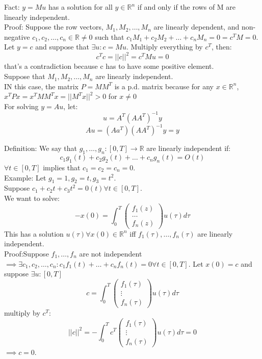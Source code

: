 \documentclass{article}
\begin{document}
Fact: $y=Mu$ has a solution for all $y\in\mathbb{R}^n$ if and only if the rows of M are linearly independent.\\
Proof: Suppose the row vectors, $M_1,M_2,\dots,M_n$ are linearly dependent, and non-negative $c_1,c_2,\dots,c_n\in\mathbb{R}\neq 0$ such that $c_1M_1+c_2M_2+\dots+c_nM_n=0=c^TM=0$.
Let $y=c$ and suppose that $\exists u: c=Mu$. Multiply everything by $c^T$, then:
\[c^Tc=\lvert\lvert c\rvert\rvert^2=c^TMu=0\]
that's a contradiction because c has to have some positive element.\\
Suppose that $M_1,M_2,\dots,M_n$ are linearly independent.\\
IN this case, the matrix $P=MM^T$ is a p.d. matrix because for any $x\in\mathbb{R}^n$, $x^TPx=x^TMM^Tx=\lvert\lvert M^Tx\rvert\rvert^2>0$ for $x\neq 0$\\
For solving $y=Au$, let:\\
\[u=A^T(AA^T)^{-1}y\]
\[Au=(Aa^T)(AA^T)^{-1}y=y\]

Definition: We say that $g_1,\dots,g_n:[0,T]\to\mathbb{R}$ are linearly independent if:
\[c_1g_1(t)+c_2g_2(t)+\dots+c_ng_n(t)=O(t)\]
$\forall t\in[0,T]$ implies that $c_1=c_2=c_n=0$.\\

Example: Let $g_1=1,g_2=t,g_3=t^2$.\\
Suppose $c_1+c_2t+c_3t^2=0(t) \forall t\in[0,T]$.\\


We want to solve:\\
\[-x(0)=\int_0^T\begin{pmatrix}f_1(z)\\\dots\\f_n(z)\end{pmatrix}u(\tau)d\tau\]
This has a solution $u(\tau)\forall x(0)\in\mathbb{R}^n$ iff $f_1(\tau),\dots,f_n(\tau)$ are linearly independent.\\
Proof:Suppose $f_1,\dots,f_n$ are not independent$\implies \exists c_1,c_2,\dots,c_n: c_1f_1(t)+\dots+c_nf_n(t)=0\forall t\in[0,T]$.
Let $x(0)=c$ and suppose $\exists u:[0,T]$\\
\[c=\int_0^T\begin{pmatrix}f_1(\tau)\\\vdots\\f_n(\tau)\end{pmatrix}u(\tau)d\tau\]
multiply by $c^T$:
\[\lvert\lvert c\rvert\rvert^2=-\int_0^Tc^T\begin{pmatrix}f_1(\tau)\\\vdots\\f_n(\tau)\end{pmatrix}u(\tau)d\tau=0\]
$\implies c=0$.\\
\end{document}
